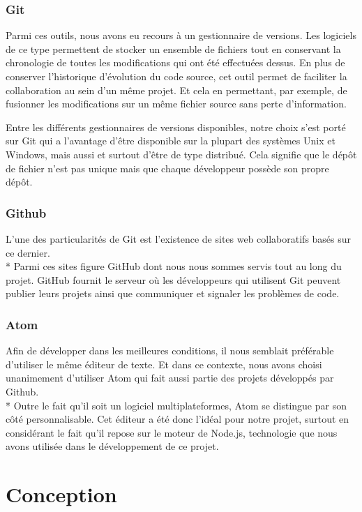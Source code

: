 \documentclass[12pt]{report}
\begin{document}
			\subsection*{Git}
	 		Parmi ces outils, nous avons eu recours à un gestionnaire de versions. Les logiciels de ce type permettent  de stocker un ensemble de fichiers tout en conservant la chronologie de toutes les modifications qui ont été effectuées dessus.
	 		En plus de conserver l’historique d’évolution du code source, cet outil permet de faciliter la collaboration au sein d’un même projet. Et cela en permettant, par exemple, de fusionner les modifications sur un même fichier source sans perte d’information.

	 		Entre les différents gestionnaires de versions disponibles, notre choix s’est porté sur Git qui a l’avantage d’être disponible sur la plupart des systèmes Unix et Windows, mais aussi et surtout d’être de type distribué. Cela signifie que le dépôt de fichier n’est pas unique mais que chaque développeur possède son propre dépôt.

 			\subsection*{Github}
   		L’une des particularités de Git est l’existence de sites web collaboratifs basés sur ce dernier.\\* Parmi ces sites figure GitHub dont nous nous sommes servis tout  au long du projet.
   		GitHub fournit le serveur où les développeurs qui utilisent Git peuvent publier leurs projets ainsi que communiquer et signaler les problèmes de code.

 			\subsection*{Atom}
   		Afin de développer dans les meilleures conditions, il nous semblait préférable d’utiliser le même éditeur de texte.
   		Et dans ce contexte, nous avons choisi unanimement d’utiliser Atom qui fait aussi partie des projets développés  par Github.\\*
   		Outre le fait qu’il soit un logiciel multiplateformes, Atom se distingue par son côté personnalisable.
   		Cet éditeur a été donc l’idéal pour notre projet, surtout en considérant le fait qu’il repose sur le moteur de Node.js, technologie que nous avons utilisée dans le développement de ce projet.


\chapter{Conception}
\end{document}
